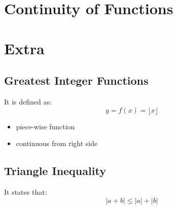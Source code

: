 \documentclass[10pt,a4paper,oneside]{article}
\begin{document}
\section{Continuity of Functions }





















\section{Extra}

\subsection{Greatest Integer Functions}
It is defined as:
\[
y = f(x) =\lfloor x \rfloor
\]
\begin{itemize}
	\item piece-wise function
	\item continuous from right side  
\end{itemize}

\subsection{Triangle Inequality}
It states that:
\[
|a+b| \leq |a| + |b|
\]
\end{document}

